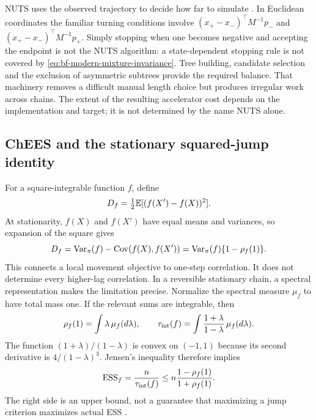 NUTS uses the observed trajectory to decide how far to simulate
\citep[Section 3.1 and Algorithm 3]{hoffman2014nuts}. In Euclidean coordinates the familiar turning
conditions involve
$(x_+-x_-)^\top M^{-1}p_-$ and
$(x_+-x_-)^\top M^{-1}p_+$. Simply stopping when one becomes negative and
accepting the endpoint is not the NUTS algorithm: a state-dependent stopping
rule is not covered by \eqref{eq:bf-modern-mixture-invariance}. Tree building,
candidate selection and the exclusion of asymmetric subtrees provide the
required balance. That machinery removes a difficult manual length choice
but produces irregular work across chains. The extent of the resulting
accelerator cost depends on the implementation and target; it is not
determined by the name NUTS alone.

\subsection{ChEES and the stationary squared-jump identity}

For a square-integrable function $f$, define
\begin{equation}
 D_f=\tfrac12\mathbb{E}[(f(X')-f(X))^2].
 \label{eq:bf-modern-esjd-definition}
\end{equation}
At stationarity, $f(X)$ and $f(X')$ have equal means and variances, so
expansion of the square gives
\begin{equation}
 D_f=\operatorname{Var}_\pi(f)-\operatorname{Cov}(f(X),f(X'))
     =\operatorname{Var}_\pi(f)\{1-\rho_f(1)\}.
 \label{eq:bf-modern-esjd-identity}
\end{equation}
This connects a local movement objective to one-step correlation. It does
not determine every higher-lag correlation. In a reversible stationary chain,
a spectral representation makes the limitation precise. Normalize the
spectral measure $\mu_f$ to have total mass one. If the relevant sums are
integrable, then
\begin{equation}
 \rho_f(1)=\int\lambda\,\mu_f(d\lambda),\qquad
 \tau_{\rm int}(f)=\int\frac{1+\lambda}{1-\lambda}\,\mu_f(d\lambda).
 \label{eq:bf-modern-spectral-iat}
\end{equation}
The function $(1+\lambda)/(1-\lambda)$ is convex on $(-1,1)$ because
its second derivative is $4/(1-\lambda)^3$. Jensen's inequality therefore
implies
\begin{equation}
 \operatorname{ESS}_f
 =\frac{n}{\tau_{\rm int}(f)}
 \leq n\frac{1-\rho_f(1)}{1+\rho_f(1)}.
 \label{eq:bf-modern-esjd-bound}
\end{equation}
The right side is an upper bound, not a guarantee that maximizing a jump
criterion maximizes actual ESS \citep[Appendix B]{sountsov2022snaper}.

